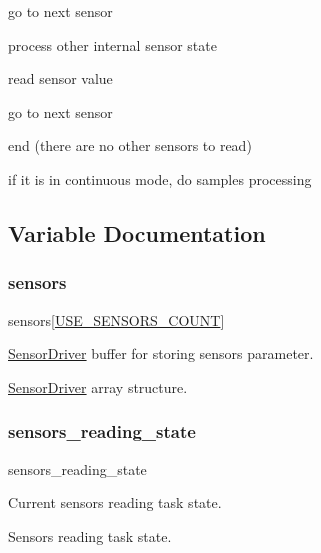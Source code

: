 go to next sensor

process other internal sensor state

read sensor value

go to next sensor

end (there are no other sensors to read)

if it is in continuous mode, do samples processing 

\subsection{Variable Documentation}
\mbox{\label{i2c-th_8h_a5f5c708cbddb6cef952fb9a28c8ba835}} 
\subsubsection{\texorpdfstring{sensors}{sensors}}
{\footnotesize\ttfamily sensors\mbox{[}\hyperlink{rmap-config_8h_af18dc3de744722cb308451b7a705611b}{U\+S\+E\+\_\+\+S\+E\+N\+S\+O\+R\+S\+\_\+\+C\+O\+U\+NT}\mbox{]}}



\hyperlink{classSensorDriver}{Sensor\+Driver} buffer for storing sensors parameter. 

\hyperlink{classSensorDriver}{Sensor\+Driver} array structure. \mbox{\label{i2c-th_8h_a2ad2494d7aa3d5924b49127e1acefe40}} 
\subsubsection{\texorpdfstring{sensors\+\_\+reading\+\_\+state}{sensors\_reading\_state}}
{\footnotesize\ttfamily sensors\+\_\+reading\+\_\+state}



Current sensors reading task state. 

Sensors reading task state. 
